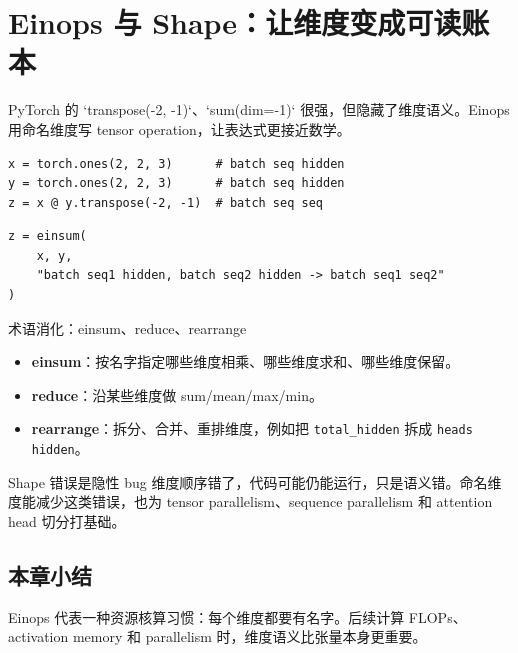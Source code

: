 \section{Einops 与 Shape：让维度变成可读账本}

PyTorch 的 `transpose(-2, -1)`、`sum(dim=-1)` 很强，但隐藏了维度语义。Einops 用命名维度写 tensor operation，让表达式更接近数学。

\begin{lstlisting}[caption={传统 PyTorch 写法容易隐藏维度含义}]
x = torch.ones(2, 2, 3)      # batch seq hidden
y = torch.ones(2, 2, 3)      # batch seq hidden
z = x @ y.transpose(-2, -1)  # batch seq seq
\end{lstlisting}

\begin{lstlisting}[caption={Einops/einsum 用名字表达维度收缩}]
z = einsum(
    x, y,
    "batch seq1 hidden, batch seq2 hidden -> batch seq1 seq2"
)
\end{lstlisting}

\begin{knowledgebox}{术语消化：einsum、reduce、rearrange}
\begin{itemize}
    \item \textbf{einsum}：按名字指定哪些维度相乘、哪些维度求和、哪些维度保留。
    \item \textbf{reduce}：沿某些维度做 sum/mean/max/min。
    \item \textbf{rearrange}：拆分、合并、重排维度，例如把 \texttt{total\_hidden} 拆成 \texttt{heads hidden}。
\end{itemize}
\end{knowledgebox}

\begin{warningbox}{Shape 错误是隐性 bug}
维度顺序错了，代码可能仍能运行，只是语义错。命名维度能减少这类错误，也为 tensor parallelism、sequence parallelism 和 attention head 切分打基础。
\end{warningbox}

\subsection{本章小结}

Einops 代表一种资源核算习惯：每个维度都要有名字。后续计算 FLOPs、activation memory 和 parallelism 时，维度语义比张量本身更重要。

